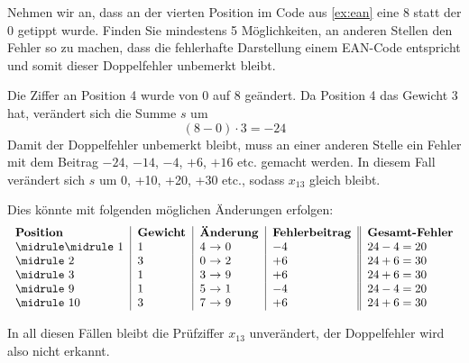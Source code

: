 \begin{myexercise}
	Nehmen wir an, dass an der vierten Position im Code aus \cref{ex:ean} eine 8 statt der 0 getippt wurde. Finden Sie mindestens 5 Möglichkeiten, an anderen Stellen den Fehler so zu machen, dass die fehlerhafte Darstellung einem \gls{EAN}-Code entspricht und somit dieser Doppelfehler unbemerkt bleibt.
	\begin{myanswer}
		Die Ziffer an Position 4 wurde von 0 auf 8 geändert. Da Position 4 das Gewicht 3 hat, verändert sich die Summe \(s\) um
		\[
			(8-0) \cdot 3 = -24
		\]
		Damit der Doppelfehler unbemerkt bleibt, muss an einer anderen Stelle ein Fehler mit dem Beitrag \(-24\), \(-14\), \(-4\), \(+6\), \(+16\) etc. gemacht werden. In diesem Fall verändert sich \(s\) um 0, +10, +20, +30 etc., sodass \(x_{13}\) gleich bleibt.

		Dies könnte mit folgenden möglichen Änderungen erfolgen:
		\[
			\begin{tabular}{l|l|l|l||l}
				\textbf{Position} & \textbf{Gewicht} & \textbf{Änderung}   & \textbf{Fehlerbeitrag} & \textbf{Gesamt-Fehler} \\
				\midrule\midrule
				1                 & 1                & 4 \(\rightarrow\) 0 & \(-4\)                 & \(24-4=20\)            \\\midrule
				2                 & 3                & 0 \(\rightarrow\) 2 & \(+6\)                 & \(24+6=30\)            \\\midrule
				3                 & 1                & 3 \(\rightarrow\) 9 & \(+6\)                 & \(24+6=30\)            \\\midrule
				9                 & 1                & 5 \(\rightarrow\) 1 & \(-4\)                 & \(24-4=20\)            \\\midrule
				10                & 3                & 7 \(\rightarrow\) 9 & \(+6\)                 & \(24+6=30\)            \\
			\end{tabular}
		\]

		In all diesen Fällen bleibt die Prüfziffer \(x_{13}\) unverändert, der Doppelfehler wird also nicht erkannt.

	\end{myanswer}
\end{myexercise}

